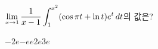 \hspace*{2mm}\begin{minipage}[t]{\dimexpr\linewidth-2mm\relax}\vspace{0pt}
$\displaystyle\lim_{x\to 1}\dfrac{1}{x-1}\int_{1}^{x^2}(\cos\pi t+\ln t)e^t\mkern3mu dt$의 값은?
\begin{choices32}{$-2e$}{$-e$}{$e$}{$2e$}{$3e$}\end{choices32}\end{minipage}
